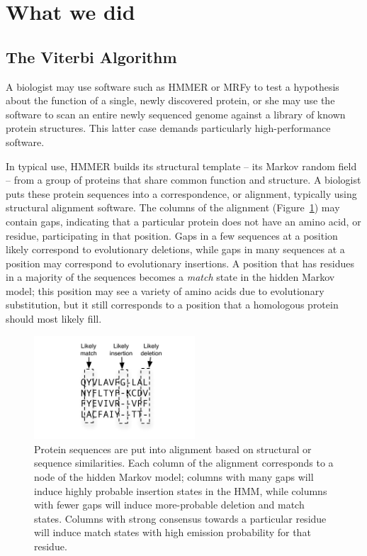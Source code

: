 \documentclass[preprint]{sigplanconf}
\begin{document}
\section{What we did}

\subsection{The Viterbi Algorithm}

A biologist may use software such as HMMER or MRFy to test a hypothesis about 
the function of a single, newly discovered protein, or she may use the software 
to scan an entire newly sequenced genome against a library of known protein 
structures. This latter case demands particularly high-performance software.

In typical use, HMMER builds its structural template -- its Markov random field 
-- from a group of proteins that share common function and structure. A 
biologist puts these protein sequences into a correspondence, or alignment, 
typically using structural alignment software. The columns of the alignment 
(Figure~\ref{alignment}) may contain gaps, indicating that a particular protein 
does not have an amino acid, or residue, participating in that position. Gaps 
in a few sequences at a position likely correspond to evolutionary deletions, 
while gaps in many sequences at a position may correspond to evolutionary 
insertions. A position that has residues in a majority of the sequences becomes 
a \textit{match} state in the hidden Markov model; this position may see a 
variety of amino acids due to evolutionary substitution, but it still 
corresponds to a position that a homologous protein should most likely fill.

\begin{figure}\centerline{\includegraphics[width=6cm]{alignment.pdf}} 
\caption{Protein sequences are put into alignment based on structural or 
sequence similarities. Each column of the alignment corresponds to a node of 
the hidden Markov model; columns with many gaps will induce highly probable 
insertion states in the HMM, while columns with fewer gaps will induce 
more-probable deletion and match states. Columns with strong consensus towards 
a particular residue will induce match states with high emission probability 
for that residue.}\label{alignment} \end{figure}
\end{document}
